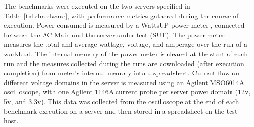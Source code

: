 \documentclass[acmtaco]{acmtrans2m}
\begin{document}
The benchmarks were executed on the two servers specified in
Table~\ref{tab:hardware}, with performance metrics gathered during the
course of execution.  Power consumed is measured by a WattsUP power meter
\cite{WattsUp2006a}, connected between the AC Main and the server under
test (SUT).  The power meter measures the total and average wattage,
voltage, and amperage over the run of a workload.  The internal memory
of the power meter is cleared at the start of each run and the measures
collected during the runs are downloaded (after execution completion)
from meter's internal memory into a spreadsheet.  Current flow on
different voltage domains in the server is measured using an Agilent
MSO6014A oscilloscope, with one Agilent 1146A current probe per server
power domain (12v, 5v, and 3.3v).  This data was collected from the
oscilloscope at the end of each benchmark execution on a server and then
stored in a spreadsheet on the test host.
\end{document}
